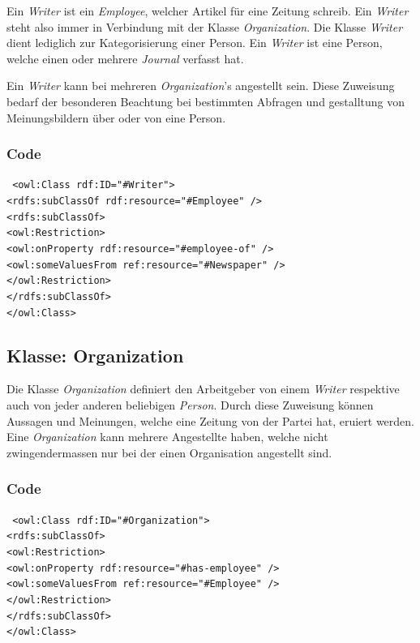 ﻿\documentclass[
    11pt,
    latin1,
    a4paper,
    oneside
]{scrreprt}
\begin{document}
Ein \emph{Writer} ist ein \emph{Employee}, welcher Artikel für eine Zeitung schreib. Ein \emph{Writer} steht also immer in Verbindung mit der Klasse \emph{Organization}. Die Klasse \emph{Writer} dient lediglich zur Kategorisierung einer Person. Ein \emph{Writer} ist eine Person, welche einen oder mehrere \emph{Journal} verfasst hat.

Ein \emph{Writer} kann bei mehreren \emph{Organization}'s angestellt sein. Diese Zuweisung bedarf der besonderen Beachtung bei bestimmten Abfragen und gestalltung von Meinungsbildern \"uber oder von eine Person.

\subsubsection{Code} \label{sec:class_writer_code}

\texttt{ <owl:Class rdf:ID="#Writer"> \\
    <rdfs:subClassOf rdf:resource="#Employee" /> \\
	<rdfs:subClassOf> \\
		<owl:Restriction> \\
			<owl:onProperty rdf:resource="#employee-of" /> \\
			<owl:someValuesFrom ref:resource="#Newspaper" /> \\
		</owl:Restriction> \\
	</rdfs:subClassOf> \\
</owl:Class> }


\subsection{Klasse: Organization} \label{sec:class_organization}

Die Klasse \emph{Organization} definiert den Arbeitgeber von einem \emph{Writer} respektive auch von jeder anderen beliebigen \emph{Person}. Durch diese Zuweisung k\"onnen Aussagen und Meinungen, welche eine Zeitung von der Partei hat, eruiert werden. Eine \emph{Organization} kann mehrere Angestellte haben, welche nicht zwingendermassen nur bei der einen Organisation angestellt sind.

\subsubsection{Code} \label{sec:class_organization_code}

\texttt{ <owl:Class rdf:ID="#Organization"> \\
	<rdfs:subClassOf> \\
		<owl:Restriction> \\
			<owl:onProperty rdf:resource="#has-employee" /> \\
			<owl:someValuesFrom ref:resource="#Employee" /> \\
		</owl:Restriction> \\
	</rdfs:subClassOf> \\
</owl:Class> }
\end{document}
